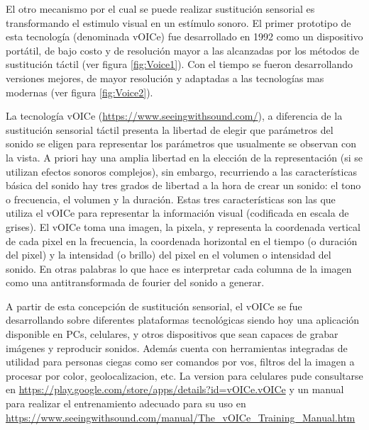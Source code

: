 \documentclass{article}
\begin{document}
    
    El otro mecanismo por el cual se puede realizar sustitución sensorial es transformando el estimulo visual en un estímulo sonoro. El primer prototipo de esta tecnología (denominada vOICe) fue desarrollado en 1992 \cite{Voice1} como un dispositivo portátil, de bajo costo y de resolución mayor a las alcanzadas por los métodos de sustitución táctil (ver figura \ref{fig:Voice1}). Con el tiempo se fueron desarrollando versiones mejores, de mayor resolución y adaptadas a las tecnologías mas modernas (ver figura \ref{fig:Voice2}).
    
    La tecnología vOICe (\url{https://www.seeingwithsound.com/}), a diferencia de la sustitución sensorial táctil presenta la libertad de elegir que parámetros del sonido se eligen para representar los parámetros que usualmente se observan con la vista. A priori hay una amplia libertad en la elección de la representación (si se utilizan efectos sonoros complejos), sin embargo, recurriendo a las características básica del sonido hay tres grados de libertad a la hora de crear un sonido: el tono o frecuencia, el volumen y la duración. Estas tres características son las que utiliza el vOICe para representar la información visual (codificada en escala de grises). El vOICe toma una imagen, la pixela, y representa la coordenada vertical de cada pixel en la frecuencia, la coordenada horizontal en el tiempo (o duración del pixel) y la intensidad (o brillo) del pixel en el volumen o intensidad del sonido. En otras palabras lo que hace es interpretar cada columna de la imagen como una antitransformada de fourier del sonido a generar. 
    
    A partir de esta concepción de sustitución sensorial, el vOICe se fue desarrollando sobre diferentes plataformas tecnológicas siendo hoy una aplicación disponible en PCs, celulares, y otros dispositivos que sean capaces de grabar imágenes y reproducir sonidos. Además cuenta con herramientas integradas de utilidad para personas ciegas como ser comandos por vos, filtros del la imagen a procesar por color, geolocalizacion, etc. La version para celulares pude consultarse en \url{https://play.google.com/store/apps/details?id=vOICe.vOICe} y un manual para realizar el entrenamiento adecuado para su uso en \url {https://www.seeingwithsound.com/manual/The_vOICe_Training_Manual.htm} 
    
\end{document}

